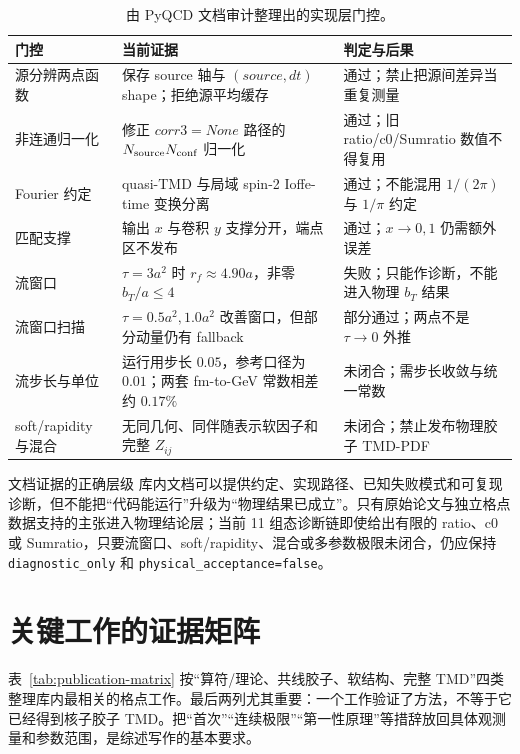 \documentclass[UTF8,12pt,a4paper,twoside,openany]{ctexbook}
\begin{document}
\begin{table}[htbp]
\centering
\caption{由 PyQCD 文档审计整理出的实现层门控。}
\label{tab:implementation-gates}
\small
\begin{tabularx}{\textwidth}{L{3.2cm}L{4.4cm}Y}
\toprule
门控 & 当前证据 & 判定与后果 \\
\midrule
源分辨两点函数 & 保存 source 轴与 \((source,dt)\) shape；拒绝源平均缓存 & 通过；禁止把源间差异当重复测量 \\
非连通归一化 & 修正 \(corr3=None\) 路径的 \(N_{\rm source}N_{\rm conf}\) 归一化 & 通过；旧 ratio/c0/Sumratio 数值不得复用 \\
Fourier 约定 & quasi-TMD 与局域 spin-2 Ioffe-time 变换分离 & 通过；不能混用 \(1/(2\pi)\) 与 \(1/\pi\) 约定 \\
匹配支撑 & 输出 \(x\) 与卷积 \(y\) 支撑分开，端点区不发布 & 通过；\(x\to0,1\) 仍需额外误差 \\
流窗口 & \(\tau=3a^2\) 时 \(r_f\approx4.90a\)，非零 \(b_T/a\le4\) & 失败；只能作诊断，不能进入物理 \(b_T\) 结果 \\
流窗口扫描 & \(\tau=0.5a^2,1.0a^2\) 改善窗口，但部分动量仍有 fallback & 部分通过；两点不是 \(\tau\to0\) 外推 \\
流步长与单位 & 运行用步长 \(0.05\)，参考口径为 \(0.01\)；两套 fm-to-GeV 常数相差约 \(0.17\%\) & 未闭合；需步长收敛与统一常数 \\
soft/rapidity 与混合 & 无同几何、同伴随表示软因子和完整 \(Z_{ij}\) & 未闭合；禁止发布物理胶子 TMD-PDF \\
\bottomrule
\end{tabularx}
\end{table}

\begin{physicalbox}{文档证据的正确层级}
库内文档可以提供约定、实现路径、已知失败模式和可复现诊断，但不能把“代码能运行”升级为“物理结果已成立”。只有原始论文与独立格点数据支持的主张进入物理结论层；当前 11 组态诊断链即使给出有限的 ratio、c0 或 Sumratio，只要流窗口、soft/rapidity、混合或多参数极限未闭合，仍应保持 \texttt{diagnostic\_only} 和 \texttt{physical\_acceptance=false}。
\end{physicalbox}

\section{关键工作的证据矩阵}

表~\ref{tab:publication-matrix} 按“算符/理论、共线胶子、软结构、完整 TMD”四类整理库内最相关的格点工作。最后两列尤其重要：一个工作验证了方法，不等于它已经得到核子胶子 TMD。把“首次”“连续极限”“第一性原理”等措辞放回具体观测量和参数范围，是综述写作的基本要求。
\end{document}
